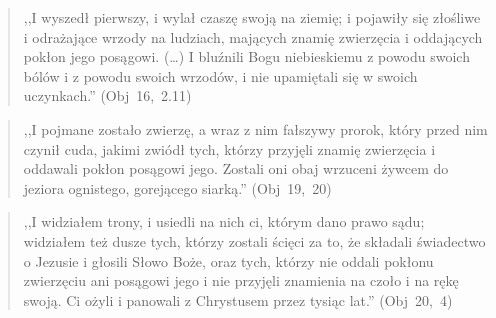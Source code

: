 \documentclass[10pt,a4paper,oneside]{article}
\begin{document}
\begin{quote}
,,I wyszedł pierwszy, i wylał czaszę swoją na ziemię; i pojawiły się złośliwe i odrażające wrzody na ludziach, mających znamię zwierzęcia i oddających pokłon jego posągowi. (\ldots) I bluźnili Bogu niebieskiemu z powodu swoich bólów i z powodu swoich wrzodów, i nie upamiętali się w swoich uczynkach.'' \mbox{(Obj 16, 2.11)}
\end{quote}
\begin{quote}
,,I pojmane zostało zwierzę, a wraz z nim fałszywy prorok, który przed nim czynił cuda, jakimi zwiódł tych, którzy przyjęli znamię zwierzęcia i oddawali pokłon posągowi jego. Zostali oni obaj wrzuceni żywcem do jeziora ognistego, gorejącego siarką.'' \mbox{(Obj 19, 20)}
\end{quote}
\begin{quote}
,,I widziałem trony, i usiedli na nich ci, którym dano prawo sądu; widziałem też dusze tych, którzy zostali ścięci za to, że składali świadectwo o Jezusie i głosili Słowo Boże, oraz tych, którzy nie oddali pokłonu zwierzęciu ani posągowi jego i nie przyjęli znamienia na czoło i na rękę swoją. Ci ożyli i panowali z Chrystusem przez tysiąc lat.'' \mbox{(Obj 20, 4)}
\end{quote}
\end{document}
